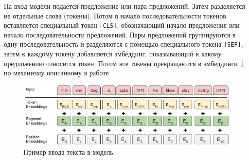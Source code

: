 \documentclass{article}
\begin{document}
На вход модели подается предложение или пара предложений. Затем разделяется на отдельные слова (токены). Потом в начало последовательности токенов вставляется специальный токен \texttt{[CLS]}, обозначающий начало предложения или начало последовательности предложений. Пары предложений группируются в одну последовательность и разделяются с помощью специального токена \texttt{[SEP]}, затем к каждому токену добавляется эмбеддинг, показывающий к какому предложению относится токен. Потом все токены превращаются в эмбеддинги~\ref{fig:inputemebeddings} по механизму описанному в работе~\autocite{vaswani_attention_2017}.

\begin{figure}[h]
\centering
\includegraphics[width=.9\linewidth]{img/Input_Emebeddings.pdf}
\caption{\label{fig:inputemebeddings}Пример ввода текста в модель}
\end{figure}
\end{document}
